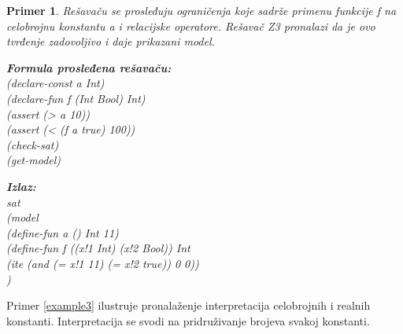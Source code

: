 \documentclass[12pt,oneside]{memoir}
\newcommand\tab[1][0.5cm]{\hspace*{#1}}
\newtheorem{primer}{Primer}
\begin{document}
\begin{primer} \label{example2} 
Rešavaču se prosleđuju ograničenja koje sadrže primenu funkcije f na celobrojnu konstantu a i relacijske operatore. Rešavač Z3 pronalazi da je ovo tvrđenje zadovoljivo i daje prikazani model. 
\\ 

\hspace{-0.7cm}
\begin{minipage}[b]{0.43\textwidth}
\textbf{Formula prosleđena rešavaču:}\\
(declare-const a Int)\\
(declare-fun f (Int Bool) Int)\\
(assert (> a 10))\\
(assert (< (f a true) 100))\\
(check-sat)\\
(get-model) \\
\end{minipage}
\hspace{0.6cm}
\begin{minipage}[t]{0.5\textwidth}
\vspace{-4.715cm}
\textbf{Izlaz:}
\\sat 
\\(model 
\\\tab(define-fun a () Int 11) 
\\\tab(define-fun f ((x!1 Int) (x!2 Bool)) Int 
\\\tab(ite (and (= x!1 11) (= x!2 true)) 0 0))
\\)
\end{minipage}
\end{primer}

Primer \ref{example3} ilustruje pronalaženje interpretacija celobrojnih i realnih konstanti. Interpretacija se svodi na pridruživanje brojeva svakoj konstanti. 
\end{document}
